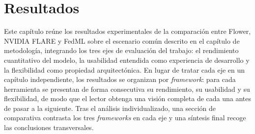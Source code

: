 
\chapter{Resultados}\label{chap:resultados}
\label{chap:resultados-rendimiento}\label{chap:usabilidad}\label{chap:flexibilidad}
\setcounter{secnumdepth}{3}

\makeatletter
\setlength{\@fptop}{0pt}
\setlength{\@fpsep}{12pt plus 0pt}
\setlength{\@fpbot}{0pt plus 1fil}
\makeatother

Este capítulo reúne los resultados experimentales de la comparación entre Flower,
NVIDIA FLARE y FedML sobre el escenario común descrito en el capítulo de
metodología, integrando los tres ejes de evaluación del trabajo: el rendimiento
cuantitativo del modelo, la usabilidad entendida como experiencia de desarrollo y
la flexibilidad como propiedad arquitectónica. En lugar de tratar cada eje en un
capítulo independiente, los resultados se organizan por \textit{framework}: para
cada herramienta se presentan de forma consecutiva su rendimiento, su usabilidad y
su flexibilidad, de modo que el lector obtenga una visión completa de cada una
antes de pasar a la siguiente. Tras el análisis individualizado, una sección de
comparativa contrasta los tres \textit{frameworks} en cada eje y una síntesis final
recoge las conclusiones transversales.

